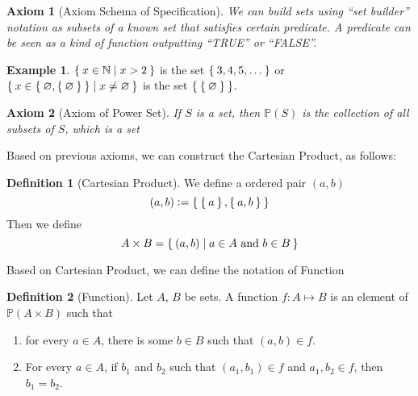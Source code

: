 \documentclass[12pt]{amsart}
\newcommand{\bbN}{\mathbb{N}}
\theoremstyle{plain}
\newtheorem{AXM}{Axiom}
\theoremstyle{remark}
\theoremstyle{definition}
\newtheorem*{define}{Definition}
\newtheorem*{eg}{Example}
\begin{document}
\begin{AXM}[Axiom Schema of Specification]
	We can build sets using ``set builder'' notation as subsets of a known set that satisfies certain predicate. A predicate can be seen as a kind of function outputting ``TRUE'' or ``FALSE''.
\end{AXM}
\begin{eg}
	$\Set{x \in \bbN| x > 2}$ is the set $\Set{3,4,5,\dots}$ or
	\newline
	$\Set{x \in \Set{\varnothing, \Set{\varnothing}}| x \neq \varnothing}$ is the set $\Set{\Set{\varnothing}}$.
\end{eg}

\begin{AXM}[Axiom of Power Set]
	If $S$ is a set, then $\mathbb{P}(S)$ is the collection of all subsets of $S$, which is a set	
\end{AXM}

Based on previous axioms, we can construct the Cartesian Product, as follows:
\begin{define}[Cartesian Product]
	We define a ordered pair $(a, b)$
	\begin{equation*}
		(a, b) \vcentcolon = \Set{\Set{a}, \Set{a, b}}
	\end{equation*}
	Then we define
	\begin{equation*}
		A \times B = \Set{(a,b) | a \in A \text{ and } b \in B}
	\end{equation*}
\end{define}

Based on Cartesian Product, we can define the notation of Function
\begin{define}[Function]
	Let $A$, $B$ be sets. A function $f:A \mapsto B$ is an element of $\mathbb{P}(A \times B)$ such that 
	\begin{enumerate}[(1)]
		\item for every $a \in A$, there is some $b \in B$ such that $(a, b) \in f$.
		\item For every $a \in A$, if $b_1$ and $b_2$ such that $(a_1, b_1) \in f$ and $a_1, b_2 \in f$, then $b_1 = b_2$.
	\end{enumerate}
\end{define}
\end{document}
